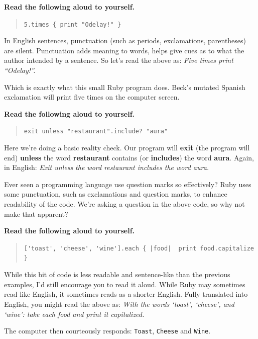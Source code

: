 \documentclass[10pt,twoside]{report}
\begin{document}
{\bf Read the following aloud to yourself.}

\begin{quote}
\lstinline[breaklines=true]|5.times { print "Odelay!" }|\end{quote}


In English sentences, punctuation (such as periods, exclamations,
parentheses) are silent.  Punctuation adds meaning to words, helps
give cues as to what the author intended by a sentence.  So let's read
the above as: {\em Five times print ``Odelay!''.}

Which is exactly what this small Ruby program does.  Beck's mutated
Spanish exclamation will print five times on the computer screen.

\newpage

{\bf Read the following aloud to yourself.}

\begin{quote}
\lstinline[breaklines=true]|exit unless "restaurant".include? "aura"|\end{quote}


Here we're doing a basic reality check.  Our program will {\bf exit}
(the program will end) {\bf unless} the word {\bf restaurant} contains
(or {\bf includes}) the word {\bf aura}.  Again, in English: {\em Exit
  unless the word restaurant includes the word aura.}

Ever seen a programming language use question marks so effectively?
Ruby uses some punctuation, such as exclamations and question marks,
to enhance readability of the code.  We're asking a question in the
above code, so why not make that apparent?

{\bf Read the following aloud to yourself.}

\begin{quote}
\lstinline[breaklines=true]$['toast', 'cheese', 'wine'].each { |food|  print food.capitalize }$\end{quote}


While this bit of code is less readable and sentence-like than the
previous examples, I'd still encourage you to read it aloud.  While
Ruby may sometimes read like English, it sometimes reads as a shorter
English.  Fully translated into English, you might read the above as:
{\em With the words `toast', `cheese', and `wine': take each food and
  print it capitalized.}

The computer then courteously responds:
\lstinline[breaklines=true]|Toast|,
\lstinline[breaklines=true]|Cheese| and
\lstinline[breaklines=true]|Wine|.
\end{document}
